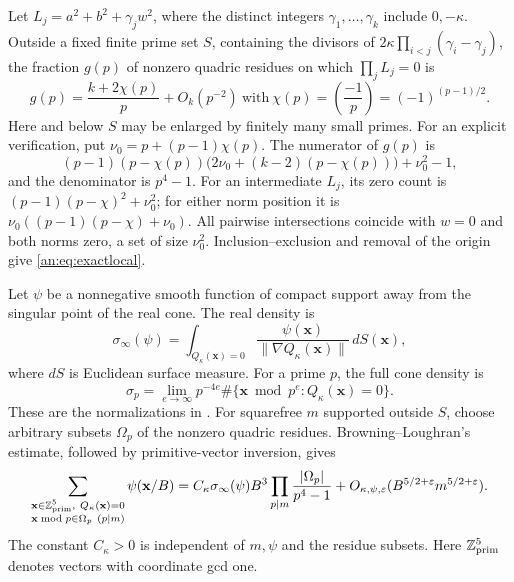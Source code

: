 \documentclass[11pt,reqno]{amsart}
\theoremstyle{definition}
\numberwithin{equation}{section}
\newcommand{\Z}{\mathbb Z}
\def\t{\text}
\begin{document}
Let $L_j=a^2+b^2+\gamma_jw^2$, where the distinct integers $\gamma_1,\ldots,\gamma_k$ include $0,-\kappa$. Outside a fixed finite prime set $S$, containing the divisors of $2\kappa\prod_{i<j}(\gamma_i-\gamma_j)$, the fraction $g(p)$ of nonzero quadric residues on which $\prod_jL_j=0$ is
\begin{equation}\label{an:eq:localg}
 g(p)=\frac{k+2\chi(p)}p+O_k(p^{-2})\ \t{with}\  \chi(p)=\left(\frac{-1}p\right)=(-1)^{(p-1)/2}.
\end{equation}
Here and below $S$ may be enlarged by finitely many small primes. For an explicit verification, put $\nu_0=p+(p-1)\chi(p)$. The numerator of $g(p)$ is
\begin{equation}\label{an:eq:exactlocal}
 (p-1)(p-\chi(p))\bigl(2\nu_0+(k-2)(p-\chi(p))\bigr)+\nu_0^2-1,
\end{equation}
and the denominator is $p^4-1$. For an intermediate $L_j$, its zero count is $(p-1)(p-\chi)^2+\nu_0^2$; for either norm position it is $\nu_0((p-1)(p-\chi)+\nu_0)$. All pairwise intersections coincide with $w=0$ and both norms zero, a set of size $\nu_0^2$. Inclusion--exclusion and removal of the origin give \eqref{an:eq:exactlocal}.

Let $\psi$ be a nonnegative smooth function of compact support away from the singular point of the real cone. The real density is
\[
 \sigma_\infty(\psi)=\int_{Q_\kappa(\mathbf x)=0}
       \frac{\psi(\mathbf x)}{\|\nabla Q_\kappa(\mathbf x)\|}\,dS(\mathbf x),
\]
where $dS$ is Euclidean surface measure. For a prime $p$, the full cone density is
\[
 \sigma_p=\lim_{e\to\infty}p^{-4e}
       \#\{\mathbf x\bmod p^e:Q_\kappa(\mathbf x)=0\}.
\]
These are the normalizations in \cite[Section 4]{BL}. For squarefree $m$ supported outside $S$, choose arbitrary subsets $\Omega_p$ of the nonzero quadric residues. Browning--Loughran's estimate, followed by primitive-vector inversion, gives
\begin{equation}\label{an:eq:primitive}
 \sum_{\substack{\mathbf x\in\Z^5_{\rm prim},\ Q_\kappa(\mathbf x)=0\\
                  \mathbf x\bmod p\in\Omega_p\ (p\mid m)}}
 \psi(\mathbf x/B)
 =C_\kappa\sigma_\infty(\psi)B^3
     \prod_{p\mid m}\frac{|\Omega_p|}{p^4-1}
 +O_{\kappa,\psi,\varepsilon}(B^{5/2+\varepsilon}m^{5/2+\varepsilon}).
\end{equation}
The constant $C_\kappa>0$ is independent of $m,\psi$ and the residue subsets. Here $\Z^5_{\rm prim}$ denotes vectors with coordinate gcd one.
\end{document}

